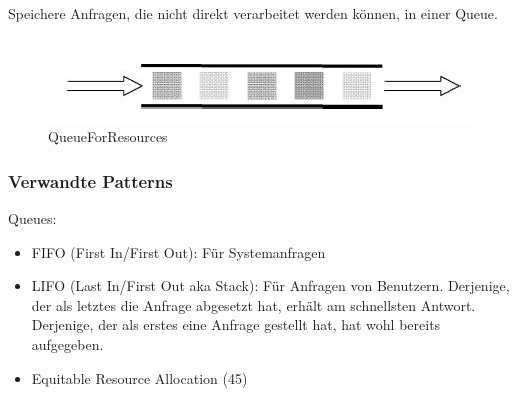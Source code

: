 Speichere Anfragen, die nicht direkt verarbeitet werden können, in einer Queue.

\begin{figure}[H]
	\centering
	\includegraphics[width=\textwidth]{content/faulttolerance/images/QueueForResources.JPG}
	\caption{QueueForResources}
\end{figure}


\subsubsection*{Verwandte Patterns}

Queues:
\begin{itemize}
	\item FIFO (First In/First Out): Für Systemanfragen
	\item LIFO (Last In/First Out aka Stack): Für Anfragen von Benutzern. Derjenige, der als letztes die Anfrage abgesetzt hat, erhält am schnellsten Antwort. Derjenige, der als erstes eine Anfrage gestellt hat, hat wohl bereits aufgegeben.
\end{itemize}

\begin{itemize}
	\item Equitable Resource Allocation (45)
\end{itemize}


